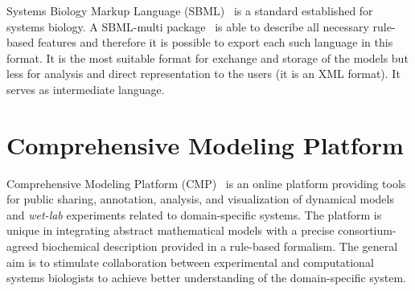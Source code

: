 \documentclass[12pt]{fithesis2}
\begin{document}
Systems Biology Markup Language (SBML)~\cite{hucka2003systems} is a standard established for systems biology. A SBML-multi package~\cite{zhang2015sbml} is able to describe all necessary rule-based features and therefore it is possible to export each such language in this format. It is the most suitable format for exchange and storage of the models but less for analysis and direct representation to the users (it is an XML format). It serves as intermediate language.

\section{Comprehensive Modeling Platform}
\label{cmp}

Comprehensive Modeling Platform (CMP)~\cite{cs2bio2013} is an online platform providing tools for public sharing, annotation, analysis, and visualization of dynamical models and \emph{wet-lab} experiments related to domain-specific systems. The platform is unique in integrating abstract mathematical models with a precise consortium-agreed biochemical description provided in a rule-based formalism. The general aim is to stimulate collaboration between experimental and computational systems biologists to achieve better understanding of the domain-specific system.
\end{document}
